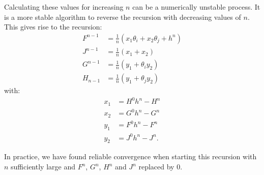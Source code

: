 Calculating these values for increasing $n$ can be a numerically unstable process. It is a more stable algorithm to reverse the recursion with decreasing values of $n$. This gives rise to the recursion:
\begin{align*}
  F^{n-1} & = \frac{1}{n}\left( x_1 \theta_i + x_2 \theta_j + h^n \right) \\
  J^{n-1} & = \frac{1}{n}\left( x_1  + x_2\right)                         \\
  G^{n-1} & = \frac{1}{n}\left( y_1  + \theta_i y_2\right)                \\
  H_{n-1} & = \frac{1}{n}\left( y_1  + \theta_j y_2\right)
\end{align*}
with:
\begin{align*}
  x_1 & = H^{0} h^n - H^n             \\
  x_2 & = G^0 h^n - G^n               \\
  y_1 & = F^{0} h^n - F^{n}           \\
  y_2 & = J^{0} h^n - J^{n}  \text{.}
\end{align*}

In practice, we have found reliable convergence when starting this recursion with $n$ sufficiently large and $F^n$, $G^n$, $H^n$ and $J^n$ replaced by $0$.

